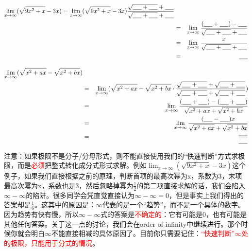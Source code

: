 \documentclass[UTF8]{ctexart}
\begin{document}
\begin{eqnarray*}
{\lim_{x \to \infty} (\sqrt{9x^2+x} -3x)} = {\lim_{x \to \infty} (\sqrt{9x^2 +x} -3x) \frac{\sqrt{\underline{\hbox to 5mm{}} + \underline{\hbox to 5mm{}}} +\underline{\hbox to 5mm{}}}{\sqrt{\underline{\hbox to 5mm{}} + \underline{\hbox to 5mm{}}} +\underline{\hbox to 5mm{}}}}\\
& = & {\lim_{x \to \infty} \frac{(\underline{\hbox to 5mm{}}+\underline{\hbox to 5mm{}})-\underline{\hbox to 5mm{}}}{\sqrt{\underline{\hbox to 5mm{}} + \underline{\hbox to 5mm{}}} +\underline{\hbox to 5mm{}}}}\\
& = &{\lim_{x \to \infty} \frac{x}{\sqrt{\underline{\hbox to 5mm{}} + \underline{\hbox to 5mm{}}} +\underline{\hbox to 5mm{}}}}\\
& = &\underline{\hbox to 5mm{}}
\end{eqnarray*}

\begin{eqnarray*}
{\lim_{x \to \infty} (\sqrt{x^2+ax} - \sqrt{x^2+bx})} \\
&= & {\lim_{x \to \infty} (\sqrt{x^2+ax} - \sqrt{x^2+bx} \cdot \frac{\sqrt{\underline{\hbox to 5mm{}} +\underline{\hbox to 5mm{}} } + \sqrt{\underline{\hbox to 5mm{}}+\underline{\hbox to 5mm{}}}}{\sqrt{\underline{\hbox to 5mm{}} +\underline{\hbox to 5mm{}} } + \sqrt{\underline{\hbox to 5mm{}}+\underline{\hbox to 5mm{}}}})}\\
& = & {\lim_{x \to \infty} \frac{(\underline{\hbox to 5mm{}}+\underline{\hbox to 5mm{}})-(\underline{\hbox to 5mm{}}+\underline{\hbox to 5mm{}})}{\sqrt{x^2+ax}+\sqrt{x^2+bx}}}\\
& = & {\lim_{x \to \infty} \frac{(\underline{\hbox to 5mm{}}-\underline{\hbox to 5mm{}})x}{\sqrt{x^2+ax}+\sqrt{x^2+bx}}}\\
& = & \frac{\underline{\hbox to 5mm{}}}{\underline{\hbox to 5mm{}}}
\end{eqnarray*}

注意：如果极限不是分子/分母形式，则不能直接使用我们的“快速判断”方式求极限，而是\textcolor{red}{必须}把整式转化成分式形式求解。例如${\lim_{x \to \infty} (\sqrt{9x^2+x} -3x)}$这个例子，如果我们直接根据之前的原理，判断首项的最高次幂为x，系数为3，末项最高次幂为x，系数也是3，然后忽略掉幂为$\frac{1}{2}$的第二项直接求解的话，我们会陷入$\infty - \infty$的陷阱。很多同学会凭直觉直接认为$\infty-\infty = 0$，但是事实上我们得出的答案却是$\frac{1}{6}$。这其中的原因是：$\infty$代表的是一个“趋势”，而不是一个具体的数字。因为趋势有快有慢，所以$\infty - \infty$式的答案是\textcolor{red}{不确定的}：它有可能是0，也有可能是其他任何答案。关于这一点的讨论，我们会在order of infinity中继续进行。那个时候你就会明白$\infty$不能直接相减的具体原因了。目前你只需要记住：\textcolor{red}{“快速判断”$\infty$处的极限，只能用于分式的情况}。
\end{document}
